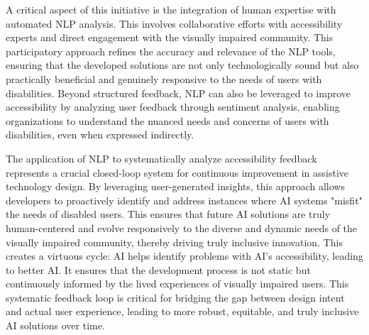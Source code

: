 A critical aspect of this initiative is the integration of human expertise with automated NLP analysis. This involves collaborative efforts with accessibility experts and direct engagement with the visually impaired community. This participatory approach refines the accuracy and relevance of the NLP tools, ensuring that the developed solutions are not only technologically sound but also practically beneficial and genuinely responsive to the needs of users with disabilities. \cite{wajdialjedaani2024} Beyond structured feedback, NLP can also be leveraged to improve accessibility by analyzing user feedback through sentiment analysis, enabling organizations to understand the nuanced needs and concerns of users with disabilities, even when expressed indirectly. \cite{numberanalytics2024}

The application of NLP to systematically analyze accessibility feedback represents a crucial closed-loop system for continuous improvement in assistive technology design. By leveraging user-generated insights, this approach allows developers to proactively identify and address instances where AI systems "misfit" the needs of disabled users. This ensures that future AI solutions are truly human-centered and evolve responsively to the diverse and dynamic needs of the visually impaired community, thereby driving truly inclusive innovation. This creates a virtuous cycle: AI helps identify problems with AI's accessibility, leading to better AI. It ensures that the development process is not static but continuously informed by the lived experiences of visually impaired users. This systematic feedback loop is critical for bridging the gap between design intent and actual user experience, leading to more robust, equitable, and truly inclusive AI solutions over time.

